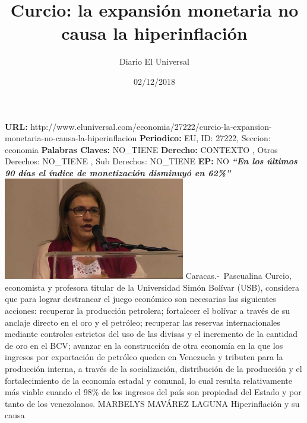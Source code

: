 \documentclass{article}%
\title{\textbf{Curcio: la expansión monetaria no causa la hiperinflación}}%
\author{Diario El Universal}%
\date{02/12/2018}%
\begin{document}
%
\normalsize%
\maketitle%
\textbf{URL: }%
http://www.eluniversal.com/economia/27222/curcio{-}la{-}expansion{-}monetaria{-}no{-}causa{-}la{-}hiperinflacion\newline%
%
\textbf{Periodico: }%
EU, %
ID: %
27222, %
Seccion: %
economia\newline%
%
\textbf{Palabras Claves: }%
NO\_TIENE\newline%
%
\textbf{Derecho: }%
CONTEXTO%
, Otros Derechos: %
NO\_TIENE%
, Sub Derechos: %
NO\_TIENE%
\newline%
%
\textbf{EP: }%
NO\newline%
\newline%
%
\textbf{\textit{“En los últimos 90 días el índice de monetización disminuyó en 62\%”}}%
\newline%
\newline%
%
\includegraphics[width=300px]{67.jpg}%
\newline%
%
Caracas.{-}~Pascualina Curcio, economista y profesora titular de la Universidad Simón Bolívar (USB), considera  que para lograr destrancar el juego económico son necesarias las siguientes acciones: recuperar la producción petrolera; fortalecer el bolívar a través de su anclaje directo en el oro y el petróleo; recuperar las reservas internacionales mediante controles estrictos del uso de las divisas y el incremento de la cantidad de oro en el BCV; avanzar en la construcción de otra economía en la que los ingresos por exportación de petróleo queden en Venezuela y tributen para la producción interna, a través de la socialización, distribución de la producción y el fortalecimiento de la economía estadal y comunal, lo cual resulta relativamente más viable cuando el 98\% de los ingresos del país son propiedad del Estado y por tanto de los venezolanos.%
\newline%
%
MARBELYS MAVÁREZ LAGUNA%
\newline%
%
Hiperinflación y su causa%
\newline%
\end{document}
